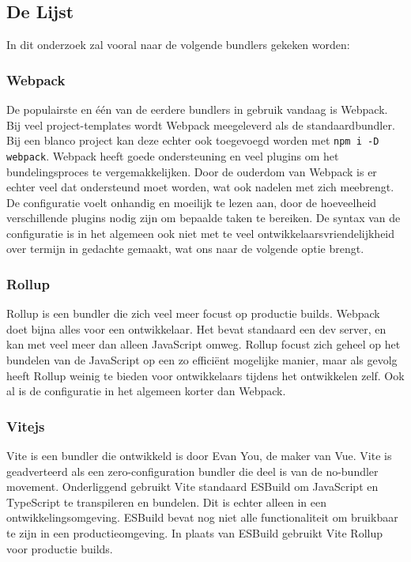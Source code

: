 
\subsection{De Lijst} 

In dit onderzoek zal vooral naar de volgende bundlers gekeken worden:

\subsubsection{Webpack}

De populairste en één van de eerdere bundlers in gebruik vandaag is Webpack. Bij veel project-templates wordt Webpack meegeleverd als de standaardbundler. Bij een blanco project kan deze echter ook toegevoegd worden met \lstinline{npm i -D webpack}. Webpack heeft goede ondersteuning en veel plugins om het bundelingsproces te vergemakkelijken. Door de ouderdom van Webpack is er echter veel dat ondersteund moet worden, wat ook nadelen met zich meebrengt. De configuratie voelt onhandig en moeilijk te lezen aan, door de hoeveelheid verschillende plugins nodig zijn om bepaalde taken te bereiken. De syntax van de configuratie is in het algemeen ook niet met te veel ontwikkelaarsvriendelijkheid over termijn in gedachte gemaakt, wat ons naar de volgende optie brengt.

\subsubsection{Rollup}

Rollup is een bundler die zich veel meer focust op productie builds. Webpack doet bijna alles voor een ontwikkelaar. Het bevat standaard een dev server, en kan met veel meer dan alleen JavaScript omweg. Rollup focust zich geheel op het bundelen van de JavaScript op een zo efficiënt mogelijke manier, maar als gevolg heeft Rollup weinig te bieden voor ontwikkelaars tijdens het ontwikkelen zelf. Ook al is de configuratie in het algemeen korter dan Webpack.

\subsubsection{Vitejs}

Vite is een bundler die ontwikkeld is door Evan You, de maker van Vue. Vite is geadverteerd als een zero-configuration bundler die deel is van de no-bundler movement. Onderliggend gebruikt Vite standaard ESBuild om JavaScript en TypeScript te transpileren en bundelen. Dit is echter alleen in een ontwikkelingsomgeving. ESBuild bevat nog niet alle functionaliteit om bruikbaar te zijn in een productieomgeving. In plaats van ESBuild gebruikt Vite Rollup voor productie builds. \autocite{you_2021}

